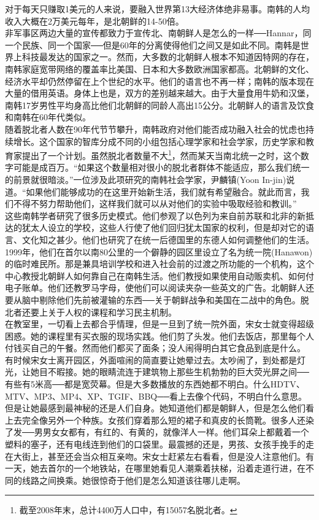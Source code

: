 对于每天只赚取1美元的人来说，要融入世界第13大经济体绝非易事。南韩的人均收入大概在2万美元每年，是北朝鲜的14-50倍。\\

非军事区两边大量的宣传都致力于宣传北、南朝鲜人是怎么的一样──Hannar，同一个民族、同一个国家──但是60年的分离使得他们之间又是如此不同。南韩是世界上科技最发达的国家之一。然而，大多数的北朝鲜人根本不知道因特网的存在，南韩家庭宽带网络的覆盖率比美国、日本和大多数欧洲国家都高。北朝鲜的文化、经济水平却仍然停留在上个世纪的水平。他们的语言也不再一样；南韩的版本现在大量的借用英语。身体上也是，双方的差别越来越大。由于大量食用牛奶和汉堡，南韩17岁男性平均身高比他们北朝鲜的同龄人高出15公分。北朝鲜人的语言及饮食和南韩在60年代类似。\\

随着脱北者人数在90年代节节攀升，南韩政府对他们能否成功融入社会的忧虑也持续增长。这个国家的智库分成不同的小组包括心理学家和社会学家，历史学家和教育家提出了一个计划。虽然脱北者数量不大\footnote{截至2008年末，总计4400万人口中，有15057名脱北者。}，然而某天当南北统一之时，这个数字可能是成百万。“如果这个数量相对很小的脱北者群体不能适应，那么我们统一的前景就很暗淡。”一位涉及此项研究的南韩社会学家，尹麟镇(Yoon In-jin)说道。“如果他们能够成功的在这里开始新生活，我们就有希望融合。就此而言，我们不得不努力帮助他们，这样我们就可以从对他们的实验中吸取经验和教训。”\\

这些南韩学者研究了很多历史模式。他们参观了以色列为来自前苏联和北非的新抵达的犹太人设立的学校，这些人行使了他们回归犹太国家的权利，但是却对它的语言、文化知之甚少。他们也研究了在统一后德国里的东德人如何调整他们的生活。\\

1999年，他们在首尔以南80公里的一个僻静的园区里设立了名为统一院(Hanawon)的临时难民所。那是兼具培训学校和进入社会前的过渡之所功能的一个机构，这个中心教授北朝鲜人如何靠自己在南韩生活。他们教授如果使用自动贩卖机、如何付电子账单。他们还教罗马字母，使他们可以阅读夹杂一些英文的广告。北朝鲜人还要从脑中剔除他们先前被灌输的东西──关于朝鲜战争和美国在二战中的角色。脱北者还要上关于人权的课程和学习民主机制。\\

在教室里，一切看上去都合乎情理，但是一旦到了统一院外面，宋女士就变得超级困惑。她的课程里有买衣服的现场实践。他们剪了头发。他们去饭店，那里每个人付钱买自己的午餐。然而他们都买了面条；没人闹得明白其它食品到底是什么。\\

有时候宋女士离开园区，外面喧闹的简直要让她晕过去。太吵闹了，到处都是灯光，让她目不暇接。她的眼睛流连于建筑物上那些生机勃勃的巨大荧光屏之间──有些有5米高──都是宽荧幕。但是大多数播放的东西她都不明白。什么HDTV、MTV、MP3、MP4、XP、TGIF、BBQ──看上去像个代码，不明白什么意思。但是让她最感到最神秘的还是人们自身。她知道他们都是朝鲜人，但是怎么他们看上去完全像另外一个种族。女孩们穿着那么短的裙子和真皮的长筒靴。很多人还染了发──男男女女都有，有红的、有黄的，就像洋人一样。他们耳朵上都戴着一个塑料的塞子，还有电线连到他们的口袋里。最震撼的还是，男孩、女孩手挽手的走在大街上，甚至还会当众相互亲吻。宋女士赶紧左右看看，但是没人注意他们。有一天，她去首尔的一个地铁站，在哪里她看见人潮乘着扶梯，沿着走道行进，在不同的线路之间换乘。她很惊奇于他们是怎么知道该往哪儿走啊。\\

